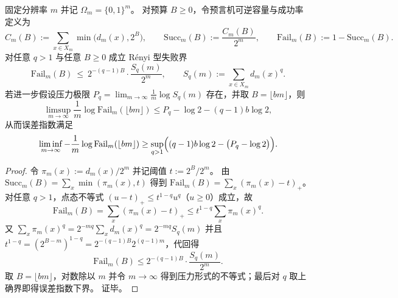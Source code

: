 \begin{theorem}\label{thm:pom-oracle-renyi-pressure-failure-bound}
固定分辨率 \(m\) 并记 \(\Omega_m=\{0,1\}^m\)。
对预算 \(B\ge 0\)，令预言机可逆容量与成功率定义为
\[
C_m(B):=\sum_{x\in X_m}\min\bigl(d_m(x),2^B\bigr),
\qquad
\mathrm{Succ}_m(B):=\frac{C_m(B)}{2^m},
\qquad
\mathrm{Fail}_m(B):=1-\mathrm{Succ}_m(B).
\]
对任意 \(q>1\) 与任意 \(B\ge 0\) 成立 R\'enyi 型失败界
\[
\boxed{\;
\mathrm{Fail}_m(B)\ \le\ 2^{-(q-1)B}\cdot \frac{S_q(m)}{2^m},
\qquad
S_q(m):=\sum_{x\in X_m}d_m(x)^q.\;}
\]
若进一步假设压力极限
\(
P_q=\lim_{m\to\infty}\frac{1}{m}\log S_q(m)
\)
存在，并取 \(B=\lfloor bm\rfloor\)，则
\[
\limsup_{m\to\infty}\frac{1}{m}\log \mathrm{Fail}_m(\lfloor bm\rfloor)
\le
P_q-\log 2-(q-1)b\log 2,
\]
从而误差指数满足
\[
\liminf_{m\to\infty}-\frac{1}{m}\log \mathrm{Fail}_m(\lfloor bm\rfloor)
\ge
\sup_{q>1}\Bigl((q-1)b\log 2-\bigl(P_q-\log 2\bigr)\Bigr).
\]
\end{theorem}

\begin{proof}
令 \(\pi_m(x):=d_m(x)/2^m\) 并记阈值 \(t:=2^B/2^m\)。
由
\(
\mathrm{Succ}_m(B)=\sum_x \min(\pi_m(x),t)
\)
得到
\(
\mathrm{Fail}_m(B)=\sum_x (\pi_m(x)-t)_+
\)。
对任意 \(q>1\)，点态不等式 \((u-t)_+\le t^{1-q}u^q\)（\(u\ge 0\)）成立，故
\[
\mathrm{Fail}_m(B)
=\sum_x (\pi_m(x)-t)_+
\le t^{1-q}\sum_x \pi_m(x)^q.
\]
又
\(
\sum_x \pi_m(x)^q
=2^{-mq}\sum_x d_m(x)^q
=2^{-mq}S_q(m)
\)
并且
\(
t^{1-q}=(2^{B-m})^{1-q}=2^{-(q-1)B}2^{(q-1)m}
\)，代回得
\[
\mathrm{Fail}_m(B)\le 2^{-(q-1)B}\cdot \frac{S_q(m)}{2^m}.
\]
取 \(B=\lfloor bm\rfloor\)，对数除以 \(m\) 并令 \(m\to\infty\) 得到压力形式的不等式；最后对 \(q\) 取上确界即得误差指数下界。
证毕。
\end{proof}

